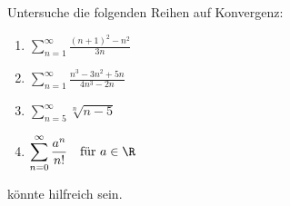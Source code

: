 \begin{exercise}
  Untersuche die folgenden Reihen auf Konvergenz:
  \begin{enumerate}
  \item $\displaystyle \sum_{n=1}^\infty \frac{(n + 1)^2 - n^2}{3n}$
  \item $\displaystyle \sum_{n=1}^\infty \frac{n^3 - 3n^2 + 5n}{4n^3 - 2n}$
  \item $\displaystyle \sum_{n=5}^\infty \sqrt[n]{n - 5}$
  \item $\displaystyle \sum_{n=0}^\infty \frac{a^n}{n!} \quad \text{für } a \in \R$
  \end{enumerate}
   könnte hilfreich sein.
\end{exercise}
